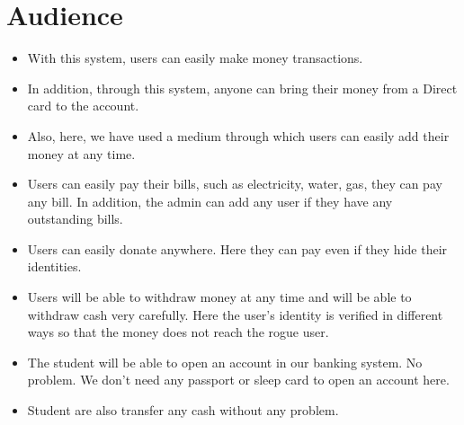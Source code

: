 \documentclass{article}
\begin{document}
\section{Audience}

\begin{itemize}
  \item With this system, users can easily make money         transactions.
  \item In addition, through this system, anyone can bring their money from a Direct card to the account.
  \item Also, here, we have used a medium through which users can easily add their money at any time.
  \item Users can easily pay their bills, such as electricity, water, gas, they can pay any bill. In addition, the admin can add any user if they have any outstanding bills.
  \item Users can easily donate anywhere. Here they can pay even if they hide their identities.
  \item Users will be able to withdraw money at any time and will be able to withdraw cash very carefully. Here the user's identity is verified in different ways so that the money does not reach the rogue user.
  \item The student will be able to open an account in our banking system. No problem. We don't need any passport or sleep card to open an account here.
  \item Student are also transfer any cash without any problem.
\end{itemize}
\end{document}
